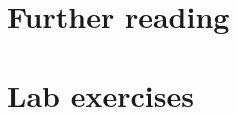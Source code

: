 \documentclass[11pt]{book}\usepackage[]{graphicx}\usepackage[]{color}
\begin{document}
\section{Further reading}\label{sec:ca-reading}
\section{Lab exercises}\label{sec:ca-lab}



%
%
%
%
%
%

%
%
%
\backmatter
{}
{\itemsep -1pt

}

%

\end{document}
